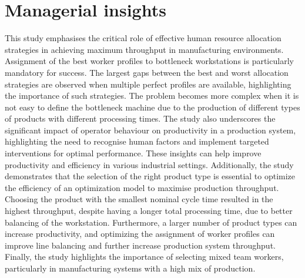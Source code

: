 \documentclass[review,12pt, 3p, times]{elsarticle}
\begin{document}
						       
					
\section{Managerial insights }\label{sec:mins}
This study emphasises the critical role of effective human resource allocation strategies in achieving maximum throughput in manufacturing environments. Assignment of the best worker profiles to bottleneck workstations is particularly mandatory for success. The largest gaps between the best and worst allocation strategies are observed when multiple perfect profiles are available, highlighting the importance of such strategies. The problem becomes more complex when it is not easy to define the bottleneck machine due to the production of different types of products with different processing times.  
The study also underscores the significant impact of operator behaviour on productivity in a production system, highlighting the need to recognise human factors and implement targeted interventions for optimal performance. These insights can help improve productivity and efficiency in various industrial settings. Additionally, the study demonstrates that the selection of the right product type is essential to optimize the efficiency of an optimization model to maximise production throughput. Choosing the product with the smallest nominal cycle time resulted in the highest throughput, despite having a longer total processing time, due to better balancing of the workstation. Furthermore, a larger number of product types can increase productivity, and optimizing the assignment of worker profiles can improve line balancing and further increase production system throughput. Finally, the study highlights the importance of selecting mixed team workers, particularly in manufacturing systems with a high mix of production.  
\end{document}

